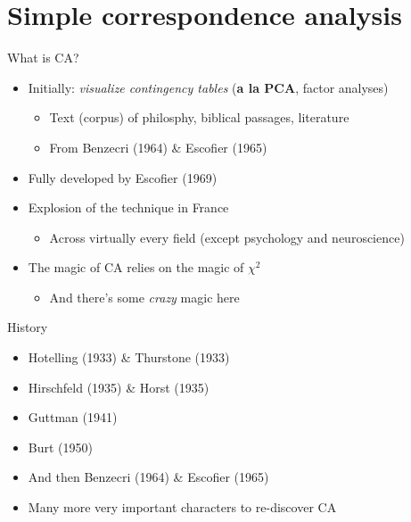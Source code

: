 \documentclass[
  ignorenonframetext,
]{beamer}
\providecommand{\tightlist}{%
  \setlength{\itemsep}{0pt}\setlength{\parskip}{0pt}}
\begin{document}
\hypertarget{simple-correspondence-analysis}{%
\section{Simple correspondence
analysis}\label{simple-correspondence-analysis}}

\begin{frame}{What is CA?}
\protect\hypertarget{what-is-ca}{}

\begin{itemize}[<+->]
\tightlist
\item
  Initially: \emph{visualize contingency tables} (\textbf{a la PCA},
  factor analyses)

  \begin{itemize}[<+->]
  \tightlist
  \item
    Text (corpus) of philosphy, biblical passages, literature
  \item
    From Benzecri (1964) \& Escofier (1965)
  \end{itemize}
\item
  Fully developed by Escofier (1969)
\item
  Explosion of the technique in France

  \begin{itemize}[<+->]
  \tightlist
  \item
    Across virtually every field (except psychology and neuroscience)
  \end{itemize}
\item
  The magic of CA relies on the magic of \(\chi^2\)

  \begin{itemize}[<+->]
  \tightlist
  \item
    And there's some \emph{crazy} magic here
  \end{itemize}
\end{itemize}

\end{frame}

\begin{frame}{History}
\protect\hypertarget{history}{}

\begin{itemize}[<+->]
\tightlist
\item
  Hotelling (1933) \& Thurstone (1933)
\item
  Hirschfeld (1935) \& Horst (1935)
\item
  Guttman (1941)
\item
  Burt (1950)
\item
  And then Benzecri (1964) \& Escofier (1965)
\item
  Many more very important characters to re-discover CA
\end{itemize}

\end{frame}
\end{document}
